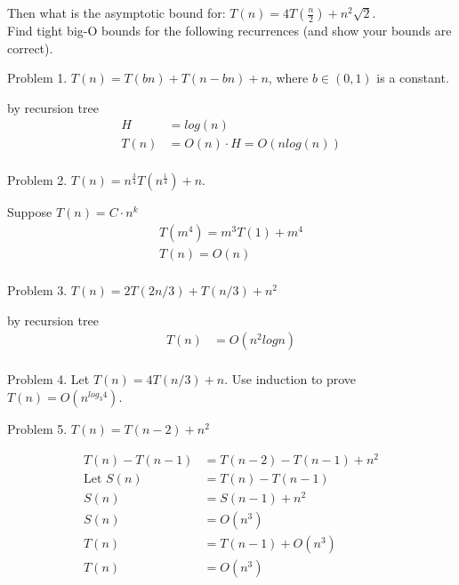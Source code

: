 Then what is the asymptotic bound for: $T(n) = 4T(\frac{n}{2}) + n^2\sqrt{2}$.
\\
Find tight big-O bounds for the following recurrences (and show your bounds are correct).

Problem 1. $T(n) = T(bn) + T(n - bn) + n$, where $b \in (0,1)$ is a constant.
\begin{solution}
    by recursion tree
    \begin{align*}
        H&=log(n)\\
        T(n)&=O(n)\cdot H=O(nlog(n))\\
    \end{align*}
    \end{solution}
Problem 2. $T(n) = n^{\frac{3}{4}}T(n^{\frac{1}{4}}) + n$.
\begin{solution}
    Suppose $ T(n)=C\cdot n^k $ 
    \begin{align*}
        T(m^4)=m^3T(1)+m^4\\
        T(n)=O(n)\\
    \end{align*}
\end{solution}
Problem 3. $T(n) = 2T(2n/3) + T(n/3) + n^2$
\begin{solution}
    by recursion tree
    \begin{align*}
        T(n)&=O(n^2logn)\\
    \end{align*}
\end{solution}
Problem 4. Let $T(n) = 4T(n/3) + n$. Use induction to prove $T(n) = O(n^{log_3 4})$.

Problem 5. $T(n) = T(n-2) + n^2$
\begin{solution}
    \begin{align*}{}{}
    T(n)-T(n-1)&=T(n-2)-T(n-1)+n^2\\
    \text{Let } S(n)&=T(n)-T(n-1)\\
    S(n)&=S(n-1)+n^2\\
    S(n)&=O(n^3)\\
    T(n)&=T(n-1)+O(n^3)\\
    T(n)&=O(n^3)\\
    \end{align*}
\end{solution}